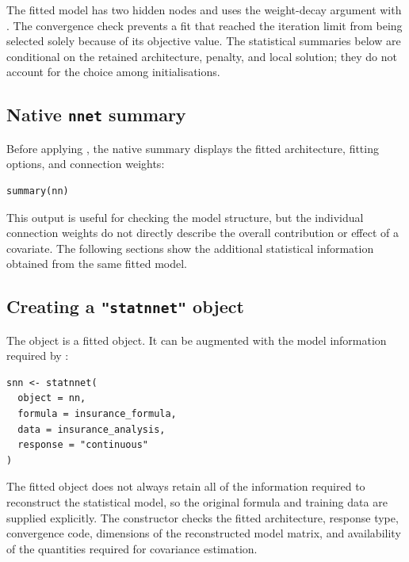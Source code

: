 The fitted model has two hidden nodes and uses the  weight-decay argument with .
The convergence check prevents a fit that reached the iteration limit from being selected solely because of its objective value.
The statistical summaries below are conditional on the retained architecture, penalty, and local solution; they do not account for the choice among initialisations.

\subsection{\texorpdfstring{Native \texttt{nnet} summary}{Native nnet summary}}\label{native-nnet-summary}

Before applying , the native summary displays the fitted architecture, fitting options, and connection weights:

\begin{verbatim}
summary(nn)
\end{verbatim}

This output is useful for checking the model structure, but the individual connection weights do not directly describe the overall contribution or effect of a covariate.
The following sections show the additional statistical information obtained from the same fitted model.

\subsection{\texorpdfstring{Creating a \texttt{"statnnet"} object}{Creating a "statnnet" object}}\label{creating-a-statnnet-object}

The object  is a fitted  object.
It can be augmented with the model information required by :

\begin{verbatim}
snn <- statnnet(
  object = nn,
  formula = insurance_formula,
  data = insurance_analysis,
  response = "continuous"
)
\end{verbatim}

The fitted  object does not always retain all of the information required to reconstruct the statistical model, so the original formula and training data are supplied explicitly.
The constructor checks the fitted architecture, response type, convergence code, dimensions of the reconstructed model matrix, and availability of the quantities required for covariance estimation.

